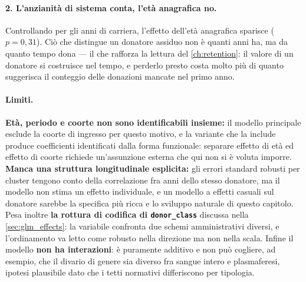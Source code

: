 \paragraph{2. L'anzianità di sistema conta, l'età anagrafica no.}
Controllando per gli anni di carriera, l'effetto dell'età anagrafica sparisce
($p = 0{,}31$). Ciò che distingue un donatore assiduo non è quanti anni ha, ma
da quanto tempo dona --- il che rafforza la lettura del \cref{ch:retention}: il
valore di un donatore si costruisce nel tempo, e perderlo presto costa molto
più di quanto suggerisca il conteggio delle donazioni mancate nel primo anno.

\paragraph{Limiti.}
\textbf{Età, periodo e coorte non sono identificabili insieme:} il modello
principale esclude la coorte di ingresso per questo motivo, e la variante che
la include produce coefficienti identificati dalla forma funzionale:
separare effetto di età ed effetto di coorte richiede
un'assunzione esterna che qui non si è voluta imporre. \textbf{Manca una
struttura longitudinale esplicita:} gli errori standard robusti per cluster
tengono conto della correlazione fra anni dello stesso donatore, ma il
modello non stima un effetto individuale, e un modello a effetti casuali sul
donatore sarebbe la specifica più ricca e lo sviluppo naturale di questo
capitolo. Pesa inoltre \textbf{la rottura di codifica di
\texttt{donor\_class}} discussa nella \cref{sec:glm_effects}: la variabile
confronta due schemi amministrativi diversi, e l'ordinamento va letto come
robusto nella direzione ma non nella scala. Infine il modello \textbf{non ha
interazioni}: è puramente additivo e non può cogliere, ad esempio, che il
divario di genere sia diverso fra sangue intero e plasmaferesi, ipotesi
plausibile dato che i tetti normativi differiscono per tipologia.

